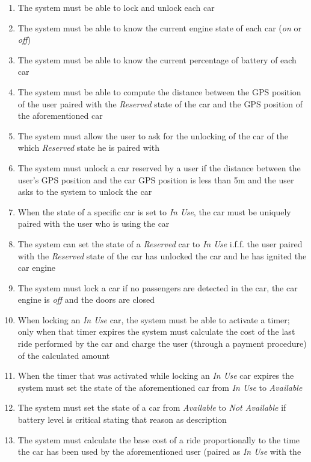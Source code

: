\begin{description}
\begin{enumerate}[resume*]
  				\item The system must be able to lock and unlock each car
  				\item The system must be able to know the current engine state of each car
  				(\emph{on} or \emph{off})
  				\item The system must be able to know the current percentage of battery of each car
  				\item The system must be able to compute the distance between the GPS position of
  				the user paired	with the \emph{Reserved} state of the car and the GPS position of the
  				aforementioned car
  				\item The system must allow the user to ask for the unlocking of the car of the which \emph{Reserved} state he is paired with
  				\item The system must unlock a car reserved by a user if the distance between the user's GPS position and the car GPS position is less than 5m and the user asks to the system to unlock the car
  				\item When the state of a specific car is set to \emph{In Use}, the car must be
 	  			uniquely paired with the user who is using the car
  				\item The system can set the state of a \emph{Reserved} car to \emph{In Use} i.f.f.
  				the user paired with the \emph{Reserved} state of the car has unlocked the car and he
  				has ignited the car engine
  				\item The system must lock a car if no passengers are detected in the car,  the car
  				engine is \emph{off} and the doors are closed
  				\item When locking  an \emph{In Use} car, the system must be able to activate a timer;
  				only when that timer expires the system must calculate the cost of the last ride
  				performed by the car and charge the user (through a payment procedure) of the calculated
  				amount
  				\item When the timer that was activated while locking an \emph{In Use} car expires the system must
  				set the state of the aforementioned car from \emph{In Use} to \emph{Available}
  				\item The system must set the state of a car from \emph{Available}
  				to \emph{Not Available} if battery level is critical  stating that reason
  				as description
  				\item The system must calculate the base cost of a ride proportionally to the time
  				the car has been used by the aforementioned user (paired as \emph{In Use} with the

\end{enumerate}
\end{description}
